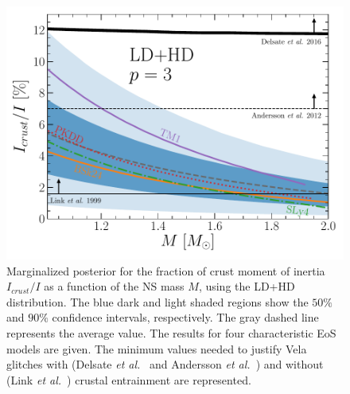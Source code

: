 \begin{figure}[!t]
  \begin{center}
    \includegraphics[width=0.9\linewidth]{figures/ifrac_vs_m.pdf}
  \end{center}
  \caption[Marginalized posterior for the fraction of crust moment of inertia
  as a function of the neutron star mass]{Marginalized posterior for the 
    fraction of crust moment of inertia $I_{crust}/I$ as a function of the NS 
    mass $M$, using the LD+HD distribution. The blue dark and light shaded 
    regions show the $50\%$ and $90\%$ confidence intervals, respectively. The 
    gray dashed line represents the average value. 
    The results for four characteristic EoS models are given. 
    The minimum values needed to justify Vela glitches with (Delsate \textit{et
    al.}~\cite{Delsate2016} and Andersson \textit{et al.}~\cite{Andersson2012}) 
    and without (Link \textit{et al.}~\cite{Link1999}) crustal entrainment are 
  represented.}\label{fig:ifrac_vs_m}
\end{figure}

